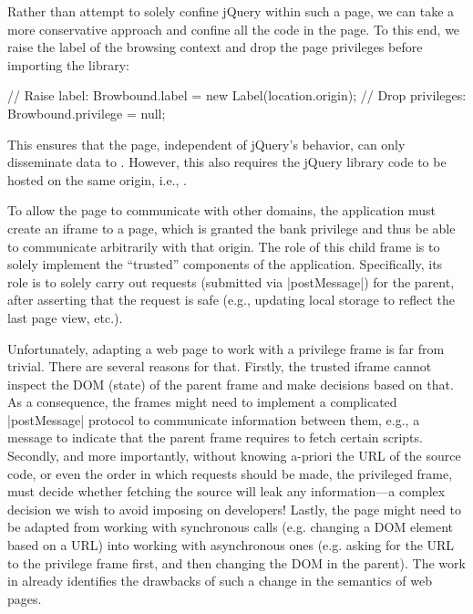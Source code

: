 Rather than attempt to solely confine jQuery within such a page, we
can take a more conservative approach and confine all the code in the
page.
%
To this end, we raise the label of the browsing context and drop the
page privileges before importing the library:
\begin{jscode}
// Raise label:
Browbound.label = new Label(location.origin);
// Drop privileges:
Browbound.privilege = null;
\end{jscode}
%
This ensures that the page, independent of jQuery's behavior, can only
disseminate data to .
%
However, this also requires the jQuery library code to be hosted on
the same origin, i.e., .
%

To allow the page to communicate with other domains, the application
must create an iframe to a  page, which is granted the
bank privilege and thus be able to communicate arbitrarily with that origin.
%
The role of this child frame is to solely implement the ``trusted''
components of the application.
%
Specifically, its role is to solely carry out requests (submitted via
\js|postMessage|) for the parent, after asserting that the request is
safe (e.g., updating local storage to reflect the last page view,
etc.).


Unfortunately, adapting a web page to work with a privilege frame 
is far from trivial. There are several reasons for that. 
%
Firstly, the trusted iframe cannot inspect the DOM (state) of the parent frame
and make decisions based on that. As a consequence, the frames might need to
implement a complicated \js|postMessage| protocol to communicate information
between them, e.g., a message to indicate that the parent frame requires to
fetch certain scripts. Secondly, and more importantly, without knowing a-priori
the URL of the source code, or even the order in which requests should be made,
the privileged frame, must decide whether fetching the source will leak any
information---a complex decision we wish to avoid imposing on developers!
Lastly, the page might need to be adapted from working with synchronous
calls (e.g. changing a DOM element based on a URL) into working with
asynchronous ones (e.g. asking for the URL to the privilege frame first, and
then changing the DOM in the parent). The work in \cite{Ingram:2012} already
identifies the drawbacks of such a change in the semantics of web pages.


%
%
%
%



